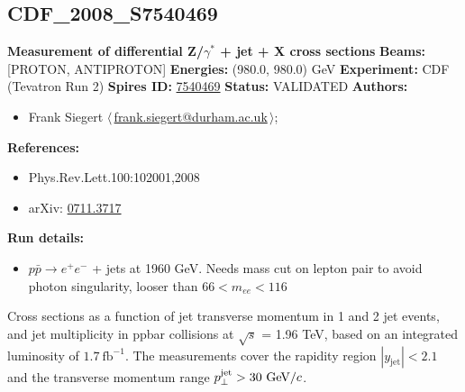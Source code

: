 \clearpage


\clearpage

\subsection[CDF\_2008\_S7540469]{CDF\_2008\_S7540469\,\cite{:2007cp}}
\textbf{Measurement of differential Z/$\gamma^*$ + jet + X cross sections}\newline
\textbf{Beams:} [PROTON, ANTIPROTON] \newline
\textbf{Energies:} (980.0, 980.0) GeV \newline
\textbf{Experiment:} CDF (Tevatron Run 2) \newline
\textbf{Spires ID:} \href{http://www.slac.stanford.edu/spires/find/hep/www?rawcmd=key+7540469}{7540469}\newline
\textbf{Status:} VALIDATED\newline
\textbf{Authors:}
\begin{itemize}
  \item Frank Siegert $\langle\,$\href{mailto:frank.siegert@durham.ac.uk}{frank.siegert@durham.ac.uk}$\,\rangle$;
\end{itemize}
\textbf{References:}
\begin{itemize}
  \item Phys.Rev.Lett.100:102001,2008
  \item arXiv: \href{http://arxiv.org/abs/0711.3717}{0711.3717}
\end{itemize}
\textbf{Run details:}
\begin{itemize}

  \item $p \bar{p} \to e^+ e^-$ + jets at 1960 GeV. Needs mass cut on lepton pair to avoid photon singularity, looser than $66 < m_{ee} < 116$\end{itemize}

\noindent Cross sections as a function of jet transverse momentum in 1 and 2 jet events, and jet multiplicity in ppbar collisions at \ensuremath{\sqrt{s}} = 1.96 TeV, based on an integrated luminosity of $1.7~\text{fb}^{-1}$. The measurements cover the rapidity region $|y_\text{jet}| < 2.1$ and the transverse momentum range $p_\perp^\text{jet} > 30~\text{GeV}/c$.

\clearpage


\clearpage


